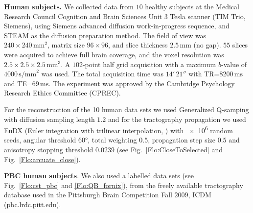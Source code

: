 \documentclass{bioinfo}
\begin{document}
\begin{methods}
\textbf{Human subjects.} We collected data from $10$ healthy subjects at
the Medical Research Council Cognition and Brain Sciences Unit 3 Tesla scanner
(TIM Trio, Siemens), using Siemens advanced diffusion work-in-progress sequence,
and STEAM \cite{merboldt1992diffusion,MAB04} as the diffusion preparation
method. The field of view was $240\times240\,\textrm{mm}^{2}$, matrix size
$96\times96$, and slice thickness $2.5\,\textrm{mm}$ (no gap).  $55$ slices were
acquired to achieve full brain coverage, and the voxel resolution was
$2.5\times2.5\times2.5\,\textrm{mm}^{3}$. A $102$-point half grid acquisition
\cite{Yeh2010} with a maximum $b$-value of $4000\, \textrm{s/mm}^{2}$ was used.
The total acquisition time was $14'\,21''$ with TR=$8200\,\textrm{ms}$ and
TE=$69\,\textrm{ms}$. The experiment was approved by the Cambridge Psychology
Research Ethics Committee (CPREC).

For the reconstruction of the 10 human data sets we used Generalized
Q-samping \cite{Yeh2010} with diffusion sampling length $1.2$ and for
the tractography propagation we used EuDX (Euler integration with
trilinear interpolation, \cite{Garyfallidis_thesis}) with \num{e6}
random seeds, angular threshold \ang{60}, total weighting $0.5$,
propagation step size $0.5$ and anisotropy stopping threshold $0.0239$
(see Fig.~\ref{Flo:CloseToSelected} and Fig.~\ref{Flo:arcuate_close}).

\textbf{PBC human subjects}. We also used a labelled data sets (see
Fig.~\ref{Flo:cst_pbc} and \ref{Flo:QB_fornix}), from the freely available
tractography database used in the Pittsburgh Brain Competition Fall
$2009$, ICDM (pbc.lrdc.pitt.edu).

\end{methods}


\end{document}
